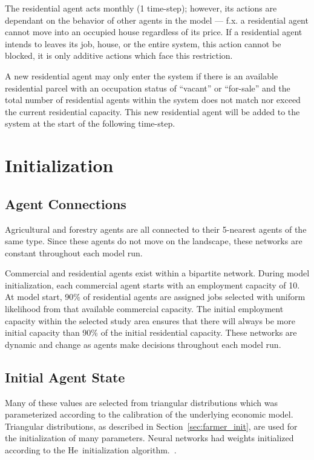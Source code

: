 The residential agent acts monthly (1 time-step); however, its actions are dependant
on the behavior of other agents in the model --- f.x. a residential agent cannot move
into an occupied house regardless of its price.
If a residential agent intends to leaves its job, house, or the entire system,
this action cannot be blocked, it is only additive actions which face this restriction.

A new residential agent may only enter the system if there is an available residential
parcel with an occupation status of ``vacant'' or ``for-sale''
and the total number of residential agents within the system does not match nor exceed
the current residential capacity.
This new residential agent will be added to the system at the start of the following
time-step.

\section{Initialization}

\subsection{Agent Connections}

Agricultural and forestry agents are all connected to their
5-nearest agents of the same type.
Since these agents do not move on the landscape, these networks are
constant throughout each model run.

Commercial and residential agents exist within a bipartite network.
During model initialization, each commercial agent starts with an
employment capacity of 10.
At model start, 90\% of residential agents are assigned jobs
selected with uniform likelihood from that available commercial capacity.
The initial employment capacity within the selected study area ensures that
there will always be more initial capacity than 90\% of the initial residential capacity.
These networks are dynamic and change as agents make decisions throughout each model run.

\subsection{Initial Agent State}

Many of these values are selected from triangular distributions
which was parameterized according to the calibration of the
underlying economic model.
Triangular distributions, as described in Section~\ref{sec:farmer_init},
are used for the initialization of many parameters.
Neural networks had weights initialized according to the He~initialization
algorithm.~\cite{he2004initialization}.

